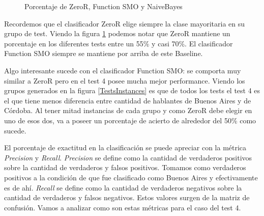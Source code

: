 \begin{figure}[H]
\centering
{}
\caption{Porcentaje de ZeroR, Function SMO y NaiveBayes}
\label{porcentajexClasificador}
\end{figure}

Recordemos que el clasificador ZeroR elige siempre la clase mayoritaria en su grupo de test. Viendo la figura \ref{porcentajexClasificador} podemos notar que ZeroR mantiene un porcentaje en los diferentes tests entre un 55\% y casi 70\%. El clasificador Function SMO siempre se mantiene por arriba de este Baseline. 

Algo interesante sucede con el clasificador Function SMO: se comporta muy similar a ZeroR pero en el test 4 posee mucha mejor performance. Viendo los grupos generados en la figura \ref{TestsInstances} es que de todos los tests el test 4 es el que tiene menos diferencia entre cantidad de hablantes de Buenos Aires y de Córdoba. Al tener mitad instancias de cada grupo y como ZeroR debe elegir en uno de esos dos, va a poseer un porcentaje de acierto de alrededor del 50\% como sucede.  

El porcentaje de exactitud en la clasificación se puede apreciar con la métrica \textit{Precision} y \textit{Recall}. \textit{Precision} se define como la cantidad de verdaderos positivos sobre la cantidad de verdaderos y falsos positivos. Tomamos como verdaderos positivos a la condición de que fue clasificado como Buenos Aires y efectivamente es de ahí. \textit{Recall} se define como la cantidad de verdaderos negativos sobre la cantidad de verdaderos y falsos negativos. Estos valores surgen de la matriz de confusión. Vamos a analizar como son estas métricas para el caso del test 4.

